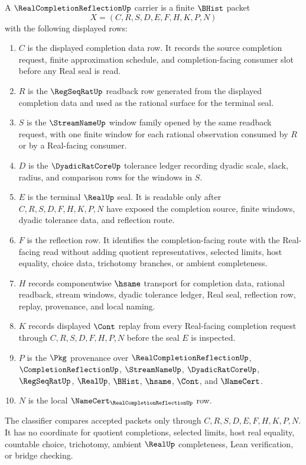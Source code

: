 \begin{definition}
\label{def:real-completion-reflection-carrier}
A $\RealCompletionReflectionUp$ carrier is a finite $\BHist$ packet
$$
X=(C,R,S,D,E,F,H,K,P,N)
$$
with the following displayed rows:
\begin{enumerate}
\item $C$ is the displayed completion data row. It records the source completion request, finite approximation schedule, and completion-facing consumer slot before any Real seal is read.
\item $R$ is the $\RegSeqRatUp$ readback row generated from the displayed completion data and used as the rational surface for the terminal seal.
\item $S$ is the $\StreamNameUp$ window family opened by the same readback request, with one finite window for each rational observation consumed by $R$ or by a Real-facing consumer.
\item $D$ is the $\DyadicRatCoreUp$ tolerance ledger recording dyadic scale, slack, radius, and comparison rows for the windows in $S$.
\item $E$ is the terminal $\RealUp$ seal. It is readable only after $C,R,S,D,F,H,K,P,N$ have exposed the completion source, finite windows, dyadic tolerance data, and reflection route.
\item $F$ is the reflection row. It identifies the completion-facing route with the Real-facing read without adding quotient representatives, selected limits, host equality, choice data, trichotomy branches, or ambient completeness.
\item $H$ records componentwise $\hsame$ transport for completion data, rational readback, stream windows, dyadic tolerance ledger, Real seal, reflection row, replay, provenance, and local naming.
\item $K$ records displayed $\Cont$ replay from every Real-facing completion request through $C,R,S,D,F,H,P,N$ before the seal $E$ is inspected.
\item $P$ is the $\Pkg$ provenance over $\RealCompletionReflectionUp$, $\CompletionReflectionUp$, $\StreamNameUp$, $\DyadicRatCoreUp$, $\RegSeqRatUp$, $\RealUp$, $\BHist$, $\hsame$, $\Cont$, and $\NameCert$.
\item $N$ is the local $\NameCert_{\RealCompletionReflectionUp}$ row.
\end{enumerate}
The classifier compares accepted packets only through $C,R,S,D,E,F,H,K,P,N$. It has no coordinate for quotient completions, selected limits, host real equality, countable choice, trichotomy, ambient $\RealUp$ completeness, Lean verification, or bridge checking.
\end{definition}

